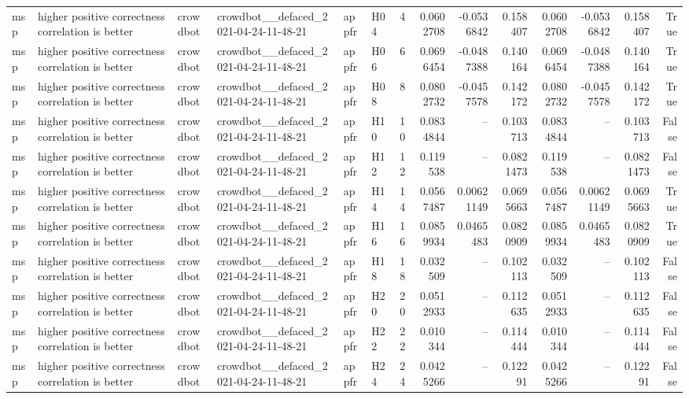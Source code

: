 \begin{longtable}{llllllrrrrrrrr}
msp & higher positive correctness correlation is better & crowdbot & crowdbot\_\_defaced\_2021-04-24-11-48-21 & appfr & H04 & 4 & 0.0602708 & -0.0536842 & 0.158407 & 0.0602708 & -0.0536842 & 0.158407 & True \\
msp & higher positive correctness correlation is better & crowdbot & crowdbot\_\_defaced\_2021-04-24-11-48-21 & appfr & H06 & 6 & 0.0696454 & -0.0487388 & 0.140164 & 0.0696454 & -0.0487388 & 0.140164 & True \\
msp & higher positive correctness correlation is better & crowdbot & crowdbot\_\_defaced\_2021-04-24-11-48-21 & appfr & H08 & 8 & 0.0802732 & -0.0457578 & 0.142172 & 0.0802732 & -0.0457578 & 0.142172 & True \\
msp & higher positive correctness correlation is better & crowdbot & crowdbot\_\_defaced\_2021-04-24-11-48-21 & appfr & H10 & 10 & 0.0834844 & -- & 0.103713 & 0.0834844 & -- & 0.103713 & False \\
msp & higher positive correctness correlation is better & crowdbot & crowdbot\_\_defaced\_2021-04-24-11-48-21 & appfr & H12 & 12 & 0.119538 & -- & 0.0821473 & 0.119538 & -- & 0.0821473 & False \\
msp & higher positive correctness correlation is better & crowdbot & crowdbot\_\_defaced\_2021-04-24-11-48-21 & appfr & H14 & 14 & 0.0567487 & 0.00621149 & 0.0695663 & 0.0567487 & 0.00621149 & 0.0695663 & True \\
msp & higher positive correctness correlation is better & crowdbot & crowdbot\_\_defaced\_2021-04-24-11-48-21 & appfr & H16 & 16 & 0.0859934 & 0.0465483 & 0.0820909 & 0.0859934 & 0.0465483 & 0.0820909 & True \\
msp & higher positive correctness correlation is better & crowdbot & crowdbot\_\_defaced\_2021-04-24-11-48-21 & appfr & H18 & 18 & 0.032509 & -- & 0.102113 & 0.032509 & -- & 0.102113 & False \\
msp & higher positive correctness correlation is better & crowdbot & crowdbot\_\_defaced\_2021-04-24-11-48-21 & appfr & H20 & 20 & 0.0512933 & -- & 0.112635 & 0.0512933 & -- & 0.112635 & False \\
msp & higher positive correctness correlation is better & crowdbot & crowdbot\_\_defaced\_2021-04-24-11-48-21 & appfr & H22 & 22 & 0.010344 & -- & 0.114444 & 0.010344 & -- & 0.114444 & False \\
msp & higher positive correctness correlation is better & crowdbot & crowdbot\_\_defaced\_2021-04-24-11-48-21 & appfr & H24 & 24 & 0.0425266 & -- & 0.12291 & 0.0425266 & -- & 0.12291 & False \\

\end{longtable}

